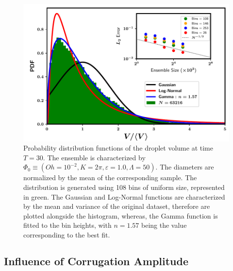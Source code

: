 
\begin{figure}
\centering
\includegraphics{plots/drop_stats/long_time_volume_fits.pdf}
\caption{Probability distribution functions of the droplet volume at time $T = 30$. 
The ensemble is characterized by $\Phi_0 \equiv \left( Oh = 10^{-2}, K = 2\pi , \varepsilon = 1.0 , \Lambda = 50 \right)$. 
The diameters are normalized by the mean of the corresponding sample.  
The distribution is generated using 108 bins of uniform size, represented in green.  
The Gaussian and Log-Normal functions are characterized by the mean and variance of the original dataset, 
therefore are plotted alongside the histogram, whereas, the Gamma function is fitted to the bin heights,
with $n= 1.57$ being the value corresponding to the best fit.
	}
\label{t2_vol_fits}
\end{figure}



\subsection*{Influence of Corrugation Amplitude}

